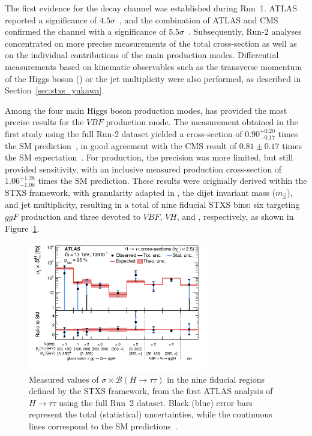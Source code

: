   The first evidence for the \htautau decay channel was established during Run~1. ATLAS reported a significance of $4.5\sigma$~\cite{htau_2015}, and the combination of ATLAS and CMS confirmed the channel with a significance of $5.5\sigma$~\cite{htau_cms_atlas_2016}. Subsequently, Run-2 analyses concentrated on more precise measurements of the total cross-section as well as on the individual contributions of the main production modes. Differential measurements based on kinematic observables such as the transverse momentum of the Higgs boson (\pth) or the jet multiplicity were also performed, as described in Section~\ref{sec:stxs_yukawa}.  
  
  Among the four main Higgs boson production modes, \htautau has provided the most precise results for the $VBF$ production mode. The measurement obtained in the first study using the full Run-2 dataset yielded a cross-section of $0.90^{+0.20}_{-0.17}$ times the SM prediction~\cite{2022}, in good agreement with the CMS result of $0.81 \pm 0.17$ times the SM expectation~\cite{Tumasyan_2023}. For \ttH production, the precision was more limited, but still provided sensitivity, with an inclusive measured production cross-section of $1.06^{+1.28}_{-1.08}$ times the SM prediction. These results were originally derived within the STXS framework, with granularity adapted in \pth, the dijet invariant mass ($m_{\text{jj}}$), and jet multiplicity, resulting in a total of nine fiducial STXS bins: six targeting $ggF$ production and three devoted to $VBF$, $VH$, and \ttH, respectively, as shown in Figure~\ref{fig:atlas_htautau_stxs}.
  
\begin{figure}[htbp]
    \centering
    \includegraphics[width=0.7\textwidth]{images/pois_9pois.png}
    \caption{Measured values of $\sigma \times \mathcal{B}(H \to \tau\tau)$ in the nine fiducial regions defined by the STXS framework, from the first ATLAS analysis of $H \to \tau\tau$ using the full Run~2 dataset. Black (blue) error bars represent the total (statistical) uncertainties, while the continuous lines correspond to the SM predictions~\cite{2022}.}
    \label{fig:atlas_htautau_stxs}
\end{figure}

